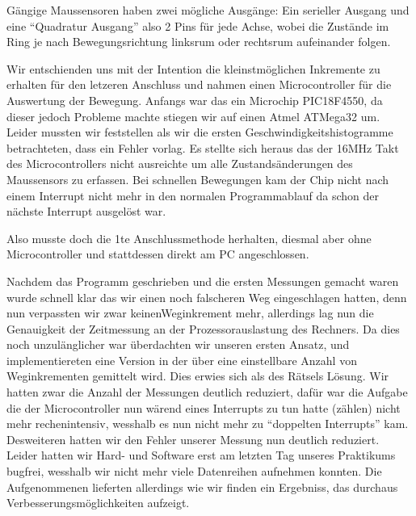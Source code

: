 \documentclass[12pt]{article}
\begin{document}
Gängige Maussensoren haben zwei mögliche Ausgänge: Ein serieller Ausgang und eine ``Quadratur Ausgang'' also 2 Pins für jede Achse, wobei die Zustände im Ring je nach Bewegungsrichtung linksrum oder rechtsrum aufeinander folgen.

Wir entschienden uns mit der Intention die kleinstmöglichen Inkremente zu erhalten für den letzeren Anschluss und nahmen einen Microcontroller für die Auswertung der Bewegung. Anfangs war das ein Microchip PIC18F4550, da dieser jedoch Probleme machte stiegen wir auf einen Atmel ATMega32 um. Leider mussten wir feststellen als wir die ersten Geschwindigkeitshistogramme betrachteten, dass ein Fehler vorlag. Es stellte sich heraus das der 16MHz Takt des Microcontrollers nicht ausreichte um alle Zustandsänderungen des Maussensors zu erfassen. Bei schnellen Bewegungen kam der Chip nicht nach einem Interrupt nicht mehr in den normalen Programmablauf da schon der nächste Interrupt ausgelöst war.


Also musste doch die 1te Anschlussmethode herhalten, diesmal aber ohne Microcontroller und stattdessen direkt am PC angeschlossen.

Nachdem das Programm geschrieben und die ersten Messungen gemacht waren wurde schnell klar das wir einen noch falscheren Weg eingeschlagen hatten, denn nun verpassten wir zwar keinenWeginkrement mehr, allerdings 
lag nun die Genauigkeit der Zeitmessung an der Prozessorauslastung des Rechners. Da dies noch unzulänglicher war überdachten wir unseren ersten Ansatz, und implementiereten eine Version in der über eine einstellbare Anzahl von Weginkrementen gemittelt wird.
Dies erwies sich als des Rätsels Lösung. Wir hatten zwar die Anzahl der Messungen deutlich reduziert, dafür war die Aufgabe die der Microcontroller nun wärend eines Interrupts zu tun hatte (zählen) nicht mehr rechenintensiv, wesshalb es nun nicht mehr zu ``doppelten Interrupts'' kam.
Desweiteren hatten wir den Fehler unserer Messung nun deutlich reduziert. Leider hatten wir Hard- und Software erst am letzten Tag unseres Praktikums bugfrei, wesshalb wir nicht mehr viele Datenreihen aufnehmen konnten. Die Aufgenommenen lieferten allerdings wie wir finden ein 
Ergebniss, das durchaus Verbesserungsmöglichkeiten aufzeigt.
\end{document}
